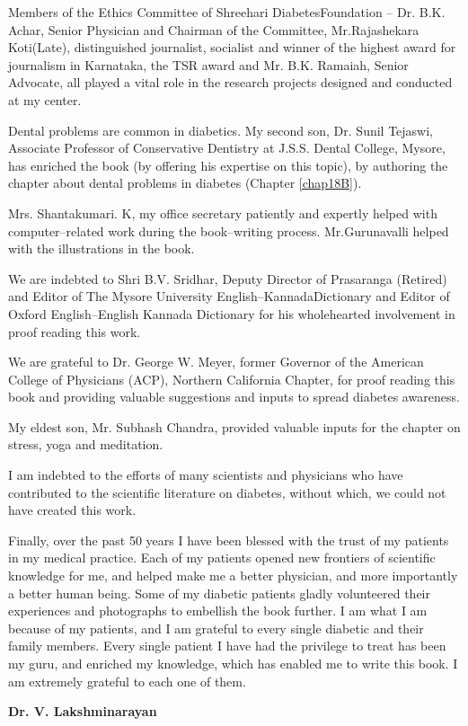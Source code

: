 Members of the Ethics Committee of Shreehari Diabetes\break Foundation – Dr. B.K. Achar, Senior Physician and Chairman of the Committee, Mr.Rajashekara Koti(Late), distinguished journa\-list, socia\-list and winner of the highest award for journalism in Karnataka, the TSR award and Mr. B.K. Ramaiah, Senior Advocate, all played a vital role in the research projects designed and conducted at my center.

Dental problems are common in diabetics. My second son, Dr. Sunil Tejaswi, Associate Professor of Conservative Dentistry at J.S.S. Dental College, Mysore, has enriched the book (by offering his expertise on this topic), by authoring the chapter about dental problems in diabetes (Chapter \ref{chap18B}).

Mrs. Shantakumari. K, my office secretary patiently and expertly helped with computer–related work during the book–writing process. Mr.Gurunavalli helped with the illustrations in the book.

We are indebted to Shri B.V. Sridhar, Deputy Director of Prasaranga (Retired) and Editor of The Mysore University English–Kannada\break Dictionary and Editor of Oxford English–English Kannada Dictionary for his wholehearted involvement in proof reading this work.

We are grateful to Dr. George W. Meyer, former Governor of the American College of Physicians (ACP), Northern California Chapter, for proof reading this book and providing valuable suggestions and inputs to spread diabetes awareness.

My eldest son, Mr. Subhash Chandra, provided valuable inputs for the chapter on stress, yoga and meditation.

I am indebted to the efforts of many scientists and physicians who have contributed to the scientific literature on diabetes, without which, we could not have created this work.

Finally, over the past 50 years I have been blessed with the trust of my patients in my medical practice. Each of my patients opened new frontiers of scientific knowledge for me, and helped make me a better physician, and more importantly a better human being. Some of my dia\-betic patients gladly volunteered their experiences and photo\-graphs to embellish the book further. I am what I am because of my patients, and I am grateful to every single diabetic and their family members. Every single patient I have had the privilege to treat has been my guru, and enriched my knowledge, which has enabled me to write this book. I am extremely grateful to each one of them.

\begin{flushright}
\textbf{Dr. V. Lakshminarayan}
\end{flushright}

